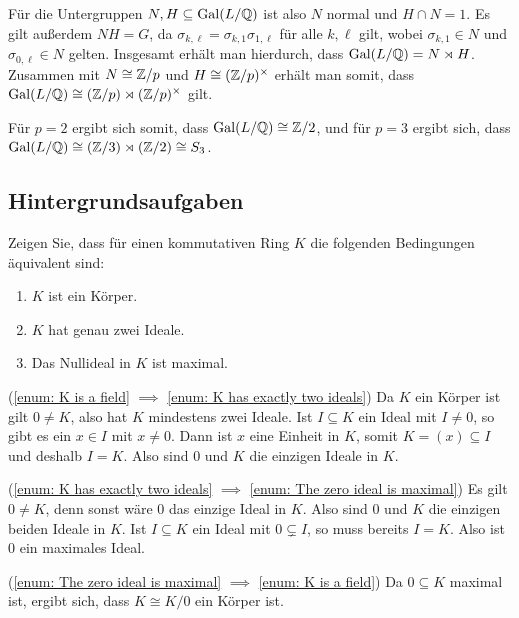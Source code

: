 \begin{solution}
  \begin{remark*}
    Für die Untergruppen $N, H \subseteq \operatorname{Gal}(L/\mathbb{Q})$ ist also $N$ normal und $H \cap N = 1$.
    Es gilt außerdem $NH = G$, da $\sigma_{k,\ell} = \sigma_{k,1} \sigma_{1,\ell}$ für alle $k, \ell$ gilt, wobei $\sigma_{k,1} \in N$ und $\sigma_{0,\ell} \in N$ gelten.
    Insgesamt erhält man hierdurch, dass $\operatorname{Gal}(L/\mathbb{Q}) = N \rtimes H$.
    Zusammen mit $N \cong \mathbb{Z}/p$ und $H \cong (\mathbb{Z}/p)^\times$ erhält man somit, dass $\operatorname{Gal}(L/\mathbb{Q}) \cong (\mathbb{Z}/p) \rtimes (\mathbb{Z}/p)^\times$ gilt.
    
    Für $p = 2$ ergibt sich somit, dass $\operatorname{Gal}(L/\mathbb{Q}) \cong \mathbb{Z}/2$, und für $p = 3$ ergibt sich, dass $\operatorname{Gal}(L/\mathbb{Q}) \cong (\mathbb{Z}/3) \rtimes (\mathbb{Z}/2) \cong S_3$.
  \end{remark*}  
\end{solution}





\subsection{Hintergrundsaufgaben}


\begin{question}[subtitle = Charakterisierung von Körpern]
  \label{question: characterization of fields via its ideals}
  Zeigen Sie, dass für einen kommutativen Ring $K$ die folgenden Bedingungen äquivalent sind:
  \begin{enumerate}
    \item
      \label{enum: K is a field}
      $K$ ist ein Körper.
    \item
      \label{enum: K has exactly two ideals}
      $K$ hat genau zwei Ideale.
    \item
      \label{enum: The zero ideal is maximal}
      Das Nullideal in $K$ ist maximal.
  \end{enumerate}
\end{question}


\begin{solution}
  (\ref{enum: K is a field} $\implies$ \ref{enum: K has exactly two ideals})
  Da $K$ ein Körper ist gilt $0 \neq K$, also hat $K$ mindestens zwei Ideale.
  Ist $I \subseteq K$ ein Ideal mit $I \neq 0$, so gibt es ein $x \in I$ mit $x \neq 0$.
  Dann ist $x$ eine Einheit in $K$, somit $K = (x) \subseteq I$ und deshalb $I = K$.
  Also sind $0$ und $K$ die einzigen Ideale in $K$.
  
  (\ref{enum: K has exactly two ideals} $\implies$ \ref{enum: The zero ideal is maximal})
  Es gilt $0 \neq K$, denn sonst wäre $0$ das einzige Ideal in $K$.
  Also sind $0$ und $K$ die einzigen beiden Ideale in $K$.
  Ist $I \subseteq K$ ein Ideal mit $0 \subsetneq I$, so muss bereits $I = K$.
  Also ist $0$ ein maximales Ideal.
  
  (\ref{enum: The zero ideal is maximal} $\implies$ \ref{enum: K is a field})
  Da $0 \subseteq K$ maximal ist, ergibt sich, dass $K \cong K/0$ ein Körper ist.
\end{solution}


